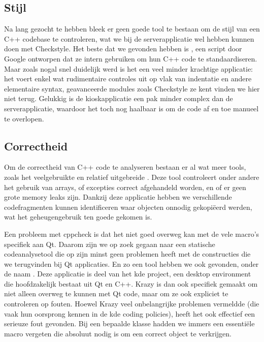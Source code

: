 \subsection{Stijl}
\label{kiosk:realisatie:codeanalyse:stijl}

Na lang gezocht te hebben bleek er geen goede tool te bestaan om de stijl van een C++ codebase te controleren, wat we bij de serverapplicatie wel hebben kunnen doen met Checkstyle. Het beste dat we gevonden hebben is , een script door Google ontworpen dat ze intern gebruiken om hun C++ code te standaardiseren. Maar zoals nogal snel duidelijk werd is het een veel minder krachtige applicatie: het voert enkel wat rudimentaire controles uit op vlak van indentatie en andere elementaire syntax, geavanceerde modules zoals Checkstyle ze kent vinden we hier niet terug. Gelukkig is de kioskapplicatie een pak minder complex dan de serverapplicatie, waardoor het toch nog haalbaar is om de code af en toe manueel te overlopen.

\subsection{Correctheid}
\label{kiosk:realisatie:codeanalyse:correctheid}

Om de correctheid van C++ code te analyseren bestaan er al wat meer tools, zoals het veelgebruikte en relatief uitgebreide . Deze tool controleert onder andere het gebruik van arrays, of excepties correct afgehandeld worden, en of er geen grote memory leaks zijn. Dankzij deze applicatie hebben we verschillende codefragmenten kunnen identificeren waar objecten onnodig gekopiëerd werden, wat het geheugengebruik ten goede gekomen is.

Een probleem met cppcheck is dat het niet goed overweg kan met de vele macro's specifiek aan Qt. Daarom zijn we op zoek gegaan naar een statische codeanalysetool die op zijn minst geen problemen heeft met de constructies die we terugvinden bij Qt applicaties. En zo een tool hebben we ook gevonden, onder de naam . Deze applicatie is deel van het \ac{kde} project, een desktop environment die hoofdzakelijk bestaat uit Qt en C++. Krazy is dan ook specifiek gemaakt om niet alleen overweg te kunnen met Qt code, maar om ze ook expliciet te controleren op fouten. Hoewel Krazy veel onbelangrijke problemen vermeldde (die vaak hun oorsprong kennen in de \ac{kde} coding policies), heeft het ook effectief een serieuze fout gevonden. Bij een bepaalde klasse hadden we immers een essentiële macro vergeten die absoluut nodig is om een correct object te verkrijgen.


